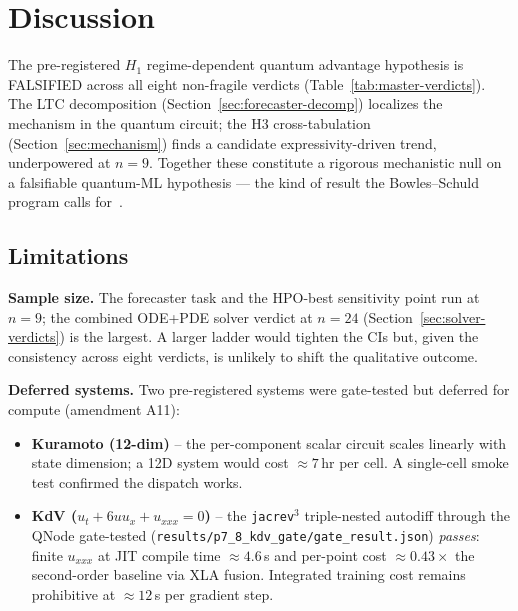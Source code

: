 
\section{Discussion}
\label{sec:discussion}

The pre-registered $H_1$ regime-dependent quantum advantage
hypothesis is FALSIFIED across all eight non-fragile verdicts
(Table~\ref{tab:master-verdicts}). The LTC decomposition
(Section~\ref{sec:forecaster-decomp}) localizes the mechanism in
the quantum circuit; the H3 cross-tabulation
(Section~\ref{sec:mechanism}) finds a candidate
expressivity-driven trend, underpowered at $n=9$. Together these
constitute a rigorous mechanistic null on a falsifiable quantum-ML
hypothesis --- the kind of result the Bowles--Schuld program
calls for~\cite{bowles2024better}.

\subsection{Limitations}
\label{sec:discussion-limitations}

\textbf{Sample size.} The forecaster task and the HPO-best
sensitivity point run at $n=9$; the combined ODE+PDE solver
verdict at $n=24$ (Section~\ref{sec:solver-verdicts}) is the
largest. A larger ladder would tighten the CIs but, given the
consistency across eight verdicts, is unlikely to shift the
qualitative outcome.

\textbf{Deferred systems.} Two pre-registered systems were
gate-tested but deferred for compute (amendment A11):
\begin{itemize}
  \item \textbf{Kuramoto (12-dim)} -- the per-component scalar
        circuit scales linearly with state dimension; a 12D
        system would cost $\approx 7$\,hr per cell. A single-cell
        smoke test confirmed the dispatch works.
  \item \textbf{KdV ($u_t + 6 u u_x + u_{xxx} = 0$)} -- the
        \texttt{jacrev$^3$} triple-nested autodiff through the
        QNode gate-tested
        (\texttt{results/p7\_8\_kdv\_gate/gate\_result.json})
        \emph{passes}: finite $u_{xxx}$ at JIT compile time
        $\approx 4.6$\,s and per-point cost $\approx 0.43\times$
        the second-order baseline via XLA fusion. Integrated
        training cost remains prohibitive at $\approx 12$\,s per
        gradient step.
\end{itemize}

